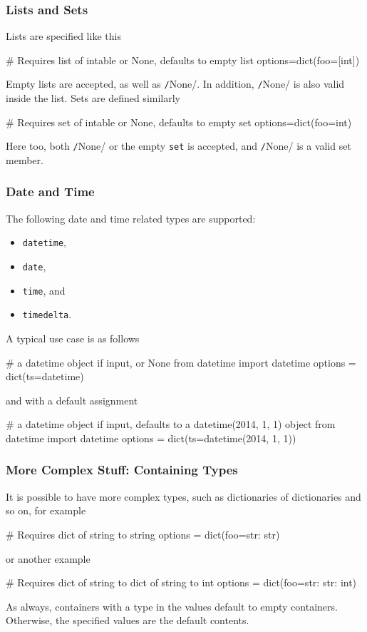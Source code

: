 \subsubsection*{Lists and Sets}
Lists are specified like this
\begin{python}
# Requires list of intable or None, defaults to empty list
options=dict(foo=[int])
\end{python}
Empty lists are accepted, as well as \texttt/None/.  In
addition, \texttt/None/ is also valid inside the list.
Sets are defined similarly
\begin{python}
# Requires set of intable or None, defaults to empty set
options=dict(foo={int})
\end{python}
Here too, both \texttt/None/ or the empty \texttt{set} is
accepted, and \texttt/None/ is a valid set member.


\subsubsection*{Date and Time}
The following date and time related types are supported:
\begin{itemize}
\item[] \texttt{datetime},
\item[] \texttt{date},
\item[] \texttt{time}, and
\item[] \texttt{timedelta}.
\end{itemize}
A typical use case is as follows
\begin{python}
# a datetime object if input, or None
from datetime import datetime
options = dict(ts=datetime)
\end{python}
and with a default assignment
\begin{python}
#  a datetime object if input, defaults to a datetime(2014, 1, 1) object
from datetime import datetime
options = dict(ts=datetime(2014, 1, 1))
\end{python}



\subsubsection*{More Complex Stuff:  Containing Types}
It is possible to have more complex types, such as dictionaries of
dictionaries and so on, for example
\begin{python}
# Requires dict of string to string
options = dict(foo={str: str})
\end{python}
or another example
\begin{python}
# Requires dict of string to dict of string to int
options = dict(foo={str: {str: int}})
\end{python}
As always, containers with a type in the values default to empty
containers.  Otherwise, the specified values are the default contents.



